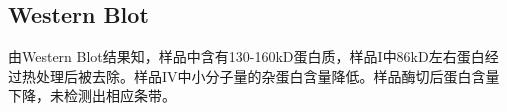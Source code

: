 \subsection{Western Blot}
\par 由Western Blot结果知，样品中含有130-160kD蛋白质，样品$\mathrm{I}$中86kD左右蛋白经过热处理后被去除。样品$\mathrm{IV}$中小分子量的杂蛋白含量降低。样品酶切后蛋白含量下降，未检测出相应条带。


